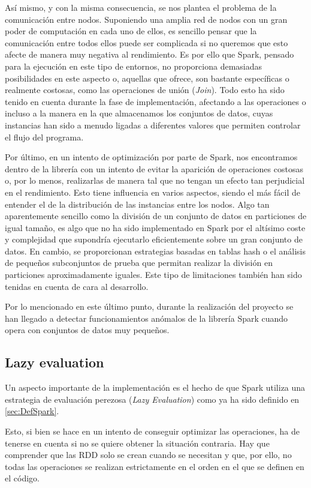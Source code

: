 Así mismo, y con la misma consecuencia, se nos plantea el problema de la comunicación entre nodos. Suponiendo una amplia red de nodos con un gran poder de computación en cada uno de ellos, es sencillo pensar que la comunicación entre todos ellos puede ser complicada si no queremos que esto afecte de manera muy negativa al rendimiento. Es por ello que Spark, pensado para la ejecución en este tipo de entornos, no proporciona demasiadas posibilidades en este aspecto o, aquellas que ofrece, son bastante específicas o realmente costosas, como las operaciones de unión (\textit{Join}). Todo esto ha sido tenido en cuenta durante la fase de implementación, afectando a las operaciones o incluso a la manera en la que almacenamos los conjuntos de datos, cuyas instancias han sido a menudo ligadas a diferentes valores que permiten controlar el flujo del programa.

Por último, en un intento de optimización por parte de Spark, nos encontramos dentro de la librería con un intento de evitar la aparición de operaciones costosas o, por lo menos, realizarlas de manera tal que no tengan un efecto tan perjudicial en el rendimiento. Esto tiene influencia en varios aspectos, siendo el más fácil de entender el de la distribución de las instancias entre los nodos. Algo tan aparentemente sencillo como la división de un conjunto de datos en particiones de igual tamaño, es algo que no ha sido implementado en Spark por el altísimo coste y complejidad que supondría ejecutarlo eficientemente sobre un gran conjunto de datos. En cambio, se proporcionan estrategias basadas en tablas hash o el análisis de pequeños subconjuntos de prueba que permitan realizar la división en particiones aproximadamente iguales. Este tipo de limitaciones también han sido tenidas en cuenta de cara al desarrollo.

Por lo mencionado en este último punto, durante la realización del proyecto se han llegado a detectar funcionamientos anómalos de la librería Spark cuando opera con conjuntos de datos muy pequeños. 

\subsection{Lazy evaluation}

Un aspecto importante de la implementación es el hecho de que Spark utiliza una estrategia de evaluación perezosa (\textit{Lazy Evaluation}) como ya ha sido definido en \ref{sec:DefSpark}.

Esto, si bien se hace en un intento de conseguir optimizar las operaciones, ha de tenerse en cuenta si no se quiere obtener la situación contraria. Hay que comprender que las RDD solo se crean cuando se necesitan y que, por ello, no todas las operaciones se realizan estrictamente en el orden en el que se definen en el código.

